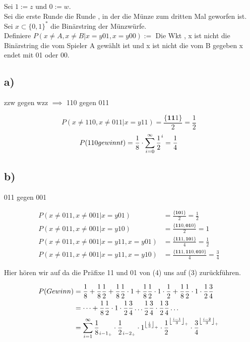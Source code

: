 \documentclass{article}
\def\mathify#1{\ifmmode{#1}\else\mbox{$#1$}\fi} %
\newcommand{\floor}[1]{\mathify{\left\lfloor {#1}\right\rfloor}}
\begin{document}
Sei $1:= z $ und $0:= w $.\\
Sei die erste Runde die Runde , in der die Münze zum dritten Mal geworfen ist.\\
Sei $x \subset \{0,1\}^{*}$ die Binärstring der Münzwürfe.\\

Definiere $P(x \neq A , x\neq B | x = y01 , x = y00) := $ Die Wkt ,  x ist nicht die Binärstring die vom Spieler A gewählt ist und x ist nicht die vom B gegeben x endet mit 01 oder 00. 

	
\subsection*{a)}
zzw gegen wzz $\implies$ 110 gegen 011

\[
P(x \neq 110 , x \neq 011 | x = y11) = \frac{\{\textbf{11}1\}}{2} = \frac{1}{2} 
\]
\[
P(110  gewinnt) = \frac{1}{8} \cdot \sum_{i=0}^{\infty} \frac{1}{2}^i = \frac{1}{4} \\ 
\]

\subsection*{b)}
011 gegen 001

\begin{align}
P(x \neq 011 , x \neq 001 | x = y01) &= \frac{\{\textbf{10}1\}}{2} = \frac{1}{2} \\
P(x \neq 011 , x \neq 001 | x = y10) &= \frac{\{\textbf{11}0,\textbf{01}0\}}{2} = 1\\
P(x \neq 011 , x \neq 001 | x = y11 , x = y01) &= \frac{\{\textbf{11}1,\textbf{10}1\}}{4} = \frac{1}{2}\\
P(x \neq 011 , x \neq 001 | x = y11 , x = y10) &= \frac{\{\textbf{11}1,\textbf{11}0,\textbf{01}0\}}{4} = \frac{3}{4}
\end{align}

Hier hören wir auf da die Präfixe 11 und 01 von (4) uns auf (3) zurückführen. 

\begin{align}
P(Gewinn) &= \frac{1}{8} + \frac{1}{8} \frac{1}{2} + \frac{1}{8}\frac{1}{2}\cdot 1 + \frac{1}{8}\frac{1}{2}\cdot 1 \cdot \frac{1}{2} + \frac{1}{8}\frac{1}{2}\cdot 1 \cdot \frac{1}{2} \frac{3}{4} \\
&= \dots +  \frac{1}{8}\frac{1}{2}\cdot 1 \cdot \frac{1}{2} \frac{3}{4} \dots \frac{1}{2} \frac{3}{4} \cdot \frac{1}{2} \frac{3}{4} \dots \\
&= \sum_{i=1}^{\infty} \frac{1}{8}_{i-1_+} \cdot \frac{1}{2}_{i-2_+} \cdot 1^{\floor{\frac{i}{3}}_+} \cdot \frac{1}{2}^{\floor{\frac{i-1}{3}}_+} \cdot \frac{3}{4}^{\floor{\frac{i-2}{3}}_+}
\end{align}
\end{document}
